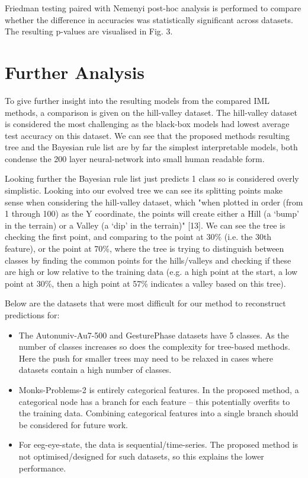 Friedman testing paired with Nemenyi post-hoc analysis is performed to compare whether the difference in accuracies was statistically significant across datasets. The resulting p-values are visualised in Fig. 3.
\section{Further Analysis}
To give further insight into the resulting models from the compared IML methods, a comparison is given on the hill-valley dataset. The hill-valley dataset is considered the most challenging as the black-box models had lowest average test accuracy on this dataset. We can see that the proposed method\textquotesingle s resulting tree and the Bayesian rule list are by far the simplest interpretable models, both condense the 200 layer neural-network into small human readable form.

Looking further the Bayesian rule list just predicts 1 class so is considered overly simplistic. Looking into our evolved tree we can see its splitting points make sense when considering the hill-valley dataset, which "when plotted in order (from 1 through 100) as the Y coordinate, the points will create either a Hill (a `bump' in the terrain) or a Valley (a `dip' in the terrain)" [13]. We can see the tree is checking the first point, and comparing to the point at 30\% (i.e. the 30th feature), or the point at 70\%, where the tree is trying to distinguish between classes by finding the common points for the hills/valleys and checking if these are high or low relative to the training data (e.g. a high point at the start, a low point at 30\%, then a high point at 57\% indicates a valley based on this tree).

Below are the datasets that were most difficult for our method to reconstruct predictions for:
\begin{itemize}
\item The Autonuniv-Au7-500 and GesturePhase datasets have 5 classes. As the number of classes increases so does the complexity for tree-based methods. Here the push for smaller trees may need to be relaxed in cases where datasets contain a high number of classes.
\item Monks-Problems-2 is entirely categorical features. In the proposed method, a categorical node has a branch for each feature -- this potentially overfits to the training data. Combining categorical features into a single branch should be considered for future work.
\item For eeg-eye-state, the data is sequential/time-series. The proposed method is not optimised/designed for such datasets, so this explains the lower performance.
\end{itemize}
